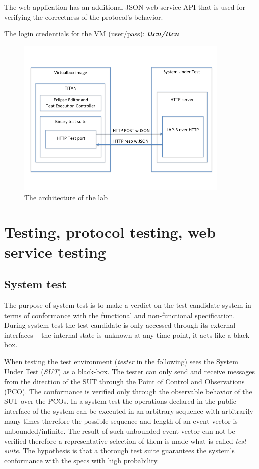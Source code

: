 \documentclass[a4paper]{article}
\begin{document}
The web application has an additional JSON web service API that is used for verifying the correctness of the protocol's
behavior.

The login credentials for the VM (user/pass): \textbf{\emph{ttcn/ttcn}}

\begin{figure}[!htb]
    \centering
    \includegraphics[width=0.9\textwidth]{figures/lab-arch.png}
    \caption{The architecture of the lab}
    \label{fig:lab-arch}
\end{figure}

\section{Testing, protocol testing, web service testing}

\subsection{System test}

The purpose of system test is to make a verdict on the test candidate system in terms of conformance with the
functional and non-functional specification. During system test the test candidate is only accessed through its
external interfaces -- the internal state is unknown at any time point, it acts like a black box.

When testing the test environment (\emph{tester} in the following) sees the System Under Test (\emph{SUT}) as a
black-box. The tester can only send and receive messages from the direction of the SUT through the Point of Control and
Observations (PCO). The conformance is verified only through the observable behavior of the SUT over the PCOs.
In a system test the operations declared in the public interface of the system can be executed in an arbitrary sequence
with arbitrarily many times therefore the possible sequence and length of an event vector is unbounded/infinite. The
result of such unbounded event vector can not be verified therefore a representative selection of them is made what is
called \emph{test suite}. The hypothesis is that a thorough test suite guarantees the system's conformance with the
specs with high probability.
\end{document}
